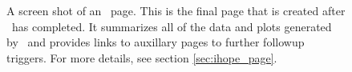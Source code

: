 \begin{figure}
\label{fig:sample_ihope_page}
\begin{center}
\end{center}
\caption{A screen shot of an \ihope~page. This is the final page that is
created after \ihope~has completed. It summarizes all of the data and plots
generated by \ihope~and provides links to auxillary pages to further followup
triggers. For more details, see section \ref{sec:ihope_page}.}
\end{figure}

